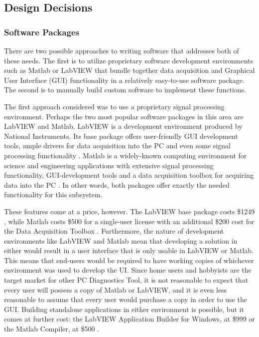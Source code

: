\subsection[Design Decisions]{Design Decisions}
\subsubsection[Software Packages]{Software Packages}
There are two possible approaches to writing software that addresses both of 
these needs. The first is to utilize proprietary software development 
environments such as Matlab or LabVIEW that bundle together data acquisition 
and Graphical User Interface (GUI) functionality in a relatively easy-to-use 
software package. The second is to manually build custom software to implement 
these functions.

The first approach considered was to use a proprietary signal processing 
environment. Perhaps the two most popular software packages in this area are 
LabVIEW and Matlab. LabVIEW is a development environment produced by National 
Instruments. Its base package offers user-friendly GUI development tools, ample 
drivers for data acquisition into the PC and even some signal processing 
functionality \cite{web:labviewbase}. Matlab is a widely-known computing 
environment for science and engineering applications with extensive signal 
processing functionality, GUI-development tools and a data acquisition toolbox 
for acquiring data into the PC \cite{web:matlab}. In other words, both packages 
offer exactly the needed functionality for this subsystem.

These features come at a price, however. The LabVIEW base package costs 
\$1249 \cite{web:labviewbase}, while Matlab costs \$500 for a single-user license with an 
additional \$200 cost for the Data Acquisition Toolbox \cite{web:matlab}\cite{web:matlabdaq}. 
Furthermore, the nature of development environments like LabVIEW and Matlab mean that 
developing a solution in either would result in a user interface that is only usable in 
LabVIEW or Matlab. This means that end-users would be required to have working 
copies of whichever environment was used to develop the UI. Since home users and 
hobbyists are the target market for other PC Diagnostics Tool, it is not reasonable 
to expect that every user will possess a copy of Matlab or LabVIEW, and it is even less 
reasonable to assume that every user would purchase a copy in order to use the 
GUI. Building standalone applications in either environment is possible, but it 
comes at further cost: the LabVIEW Application Builder for Windows, at \$999 \cite{web:labviewbase} 
or the Matlab Compiler, at \$500 \cite{web:matlabcompiler}. 


